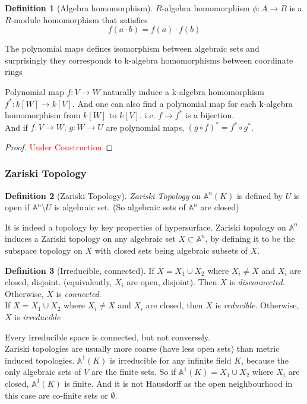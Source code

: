 \documentclass[12pt]{article}
\theoremstyle{remark}
\theoremstyle{definition}
\newtheorem{definition}{Definition}[subsection]
\newcommand{\Ac}{\mathbb{A}}   %
\begin{document}
{{        \begin{definition}[Algebra homomorphism]
            $R$-algebra homomorphism $\phi : A \rightarrow B$ is a $R$-module homomorphism that         satisfies 
            $$f(a \cdot b) = f(a) \cdot f(b)$$
        \end{definition}}
        
        The polynomial maps defines isomorphism between algebraic sets and surprisingly they corresponds         to k-algebra homomorphisms between coordinate rings 
        
        \begin{thm}
            Polynomial map $f : V \rightarrow W$ naturally induce a k-algebra homomorphism $f^* : k[W]        \rightarrow k[V]$. And one can also find a polynomial map for each k-algebra homomorphism        from $k[W]$ to $k[V]$. i.e. $f \rightarrow f^*$ is a bijection. \\
            And if $f : V \rightarrow W, \, g : W \rightarrow U$ are polynomial maps, $(g \circ f)^* =       f^* \circ g^*$. 
        \end{thm}
        \begin{proof}
            \textcolor{red}{Under Construction}
        \end{proof}
        
        
        \subsubsection{Zariski Topology}
        \begin{definition}[Zariski Topology]
            \textit{Zariski Topology} on $\Ac^n(K)$ is defined by $U$ is open if $\Ac^n \setminus U$ is algebraic set. (So algebraic sets of $\Ac^n$ are closed)
        \end{definition}
        It is indeed a topology by key properties of hypersurface. Zariski topology on $\Ac^n$ induces a Zariski topology on any algebraic set $X \subset \Ac^n$, by defining it to be the subspace topology on $X$ with closed sets being algebraic subsets of $X$. 
        
        \begin{definition}[Irreducible, connected]
            If $X = X_1 \cup X_2$  where $X_i \neq X$ and $X_i$ are closed, disjoint. (equivalently,         $X_i$ are open, disjoint). Then $X$ is \textit{disconnected}. Otherwise, $X$ is         \textit{connected}. \\
            If $X = X_1 \cup X_2$  where $X_i \neq X$ and $X_i$ are closed, then $X$ is         \textit{reducible}. Otherwise, $X$ is \textit{irreducible}
        \end{definition}
        Every irreducible space is connected, but not conversely. \\
        Zariski topologies are usually more coarse (have less open sets) than metric induced topologies.         $\Ac^1(K)$ is irreducible for any infinite field $K$, because the only algebraic sets of $V$ are       the finite sets. So if $\Ac^1(K) = X_1 \cup X_2$ where $X_i$ are closed, $\Ac^1(K)$ is finite.       And it is not Hausdorff as the open neighbourhood in this case are co-finite sets or         $\emptyset$. 
        
}
\end{document}
